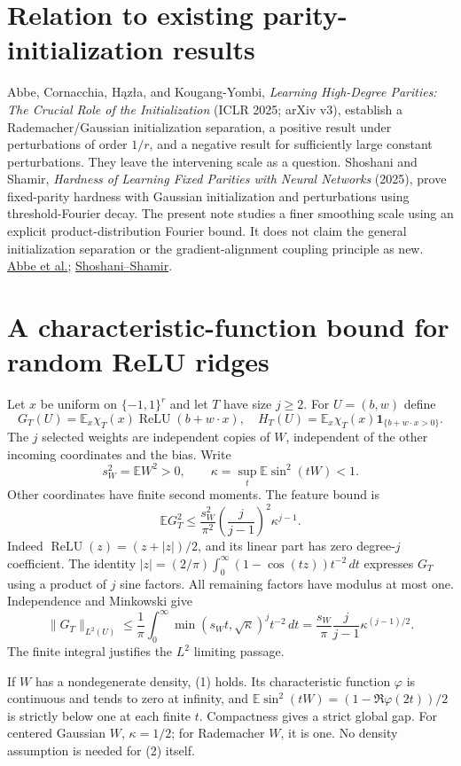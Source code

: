 \documentclass[11pt]{article}
\newcommand{\E}{\mathbb E}\newcommand{\R}{\mathbb R}
\newcommand{\relu}{\operatorname{ReLU}}
\begin{document}
\section{Relation to existing parity-initialization results}
Abbe, Cornacchia, H\k{a}z\l a, and Kougang-Yombi,
\emph{Learning High-Degree Parities: The Crucial Role of the Initialization}
(ICLR 2025; arXiv v3), establish a Rademacher/Gaussian initialization
separation, a positive result under perturbations of order $1/r$, and
a negative result for sufficiently large constant perturbations.
They leave the intervening scale as a question. Shoshani and Shamir,
\emph{Hardness of Learning Fixed Parities with Neural Networks} (2025),
prove fixed-parity hardness with Gaussian initialization and perturbations
using threshold-Fourier decay. The present note studies a finer smoothing
scale using an explicit product-distribution Fourier bound. It does not
claim the general initialization separation or the gradient-alignment
coupling principle as new.
\href{https://arxiv.org/abs/2412.04910}{Abbe et al.};
\href{https://arxiv.org/abs/2501.00817}{Shoshani--Shamir}.

\section{A characteristic-function bound for random ReLU ridges}
Let $x$ be uniform on $\{-1,1\}^r$ and let $T$ have size $j\ge2$.
For $U=(b,w)$ define
\[
 G_T(U)=\E_x\chi_T(x)\relu(b+w\cdot x),\quad
 H_T(U)=\E_x\chi_T(x)\mathbf1_{\{b+w\cdot x>0\}}.
\]
The $j$ selected weights are independent copies of $W$, independent
of the other incoming coordinates and the bias. Write
\[
 s_W^2=\E W^2>0,\qquad
 \kappa=\sup_t\E\sin^2(tW)<1.
 \tag{1}
\]
Other coordinates have finite second moments. The feature bound is
\[
 \boxed{\quad
 \E G_T^2\le\frac{s_W^2}{\pi^2}
          \left(\frac j{j-1}\right)^2\kappa^{j-1}.
 \quad}                                               \tag{2}
\]
Indeed $\relu(z)=(z+|z|)/2$, and its linear part has zero degree-$j$
coefficient. The identity
$|z|=(2/\pi)\int_0^\infty(1-\cos(tz))t^{-2}\,dt$
expresses $G_T$ using a product of $j$ sine factors. All remaining
factors have modulus at most one. Independence and Minkowski give
\[
 \|G_T\|_{L^2(U)}\le\frac1\pi
 \int_0^\infty\min(s_Wt,\sqrt\kappa)^j t^{-2}\,dt
 =\frac{s_W}{\pi}\frac j{j-1}\kappa^{(j-1)/2}.
\]
The finite integral justifies the $L^2$ limiting passage.

If $W$ has a nondegenerate density, (1) holds. Its characteristic
function $\varphi$ is continuous and tends to zero at infinity,
and $\E\sin^2(tW)=(1-\Re\varphi(2t))/2$ is strictly below one
at each finite $t$. Compactness gives a strict global gap.
For centered Gaussian $W$, $\kappa=1/2$; for Rademacher $W$, it is one.
No density assumption is needed for (2) itself.
\end{document}
